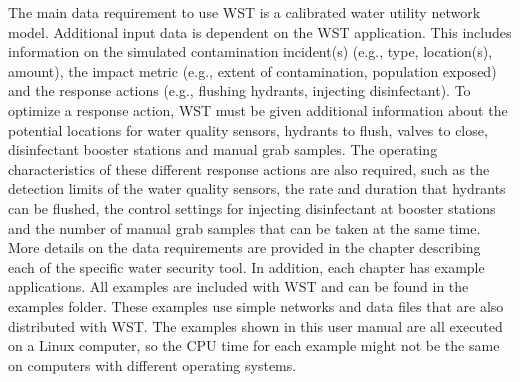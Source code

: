 The main data requirement to use WST is a calibrated water utility network model. Additional input data is 
dependent on the WST application. This includes information on the simulated contamination incident(s) 
(e.g., type, location(s), amount), the impact metric (e.g., extent of contamination, population exposed) 
and the response actions (e.g., flushing hydrants, injecting disinfectant). To optimize a response action, 
WST must be given additional information about the potential locations for water quality sensors, hydrants to flush, valves to close, 
disinfectant booster stations and manual grab samples. The operating characteristics of these different response 
actions are also required, such as the detection limits of the water quality sensors, the rate and duration that 
hydrants can be flushed, the control settings for injecting disinfectant at booster stations and the number of manual 
grab samples that can be taken at the same time. More details on the data requirements are provided 
in the chapter describing each of the specific water security tool. In addition, each chapter has example applications. 
All examples are included with WST and can be found in the examples folder. These examples use simple networks 
and data files that are also distributed with WST. The examples shown in this user manual are all executed on a 
Linux computer, so the CPU time for each example might not be the same on computers with different operating systems. 
